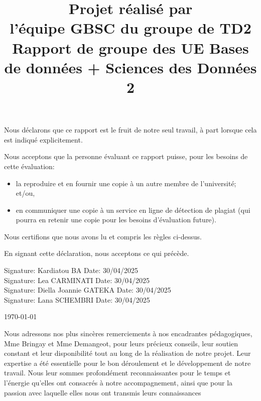 \documentclass[mstat,12pt]{unswthesis}
\title{Projet réalisé par\\[0.5cm] l'équipe GBSC du groupe de TD2 \\[3cm]Rapport
de groupe des UE \newline  Bases de données + Sciences des Données 2}
\author{\Authornameonly}
\begin{document}
\beforepreface




\vskip 2pc \noindent Nous déclarons que ce rapport est le fruit de notre seul travail, à part lorsque cela est indiqué  explicitement. 

\vskip 2pc  \noindent Nous acceptons que la personne évaluant ce rapport puisse, pour les besoins de cette évaluation:
\begin{itemize}
\item la reproduire et en fournir une copie à un autre membre de l'université; et/ou,
\item en communiquer une copie à un service en ligne de détection de plagiat (qui pourra en retenir une copie pour les besoins d'évaluation future).
\end{itemize}

\vskip 2pc \noindent Nous certifions que nous avons lu et compris les règles ci-dessus.\vspace{24pt}

\vskip 2pc \noindent En signant cette déclaration, nous acceptons ce qui précède.
\vskip 2pc \noindent

Signature: Kardiatou BA \hfill Date: 30/04/2025\\[0.5cm]
Signature: Lea CARMINATI \hfill Date: 30/04/2025 \\[0.5cm]
Signature: Diella Joannie GATEKA \hfill Date: 30/04/2025 \\[0.5cm]
Signature: Lana SCHEMBRI \hfill Date: 30/04/2025 \\[0.5cm]

\vskip 1pc


{\bigskip\bigskip\bigskip\noindent} \today




{\bigskip}Nous adressons nos plus sincères remerciements à nos
encadrantes pédagogiques, Mme Bringay et Mme Demangeot, pour leurs
précieux conseils, leur soutien constant et leur disponibilité tout au
long de la réalisation de notre projet. Leur expertise a été essentielle
pour le bon déroulement et le développement de notre travail.
\newline Nous leur sommes profondément reconnaissantes pour le temps et
l'énergie qu'elles ont consacrés à notre accompagnement, ainsi que pour
la passion avec laquelle elles nous ont transmis leurs
connaissances\\[1cm] 
\end{document}
